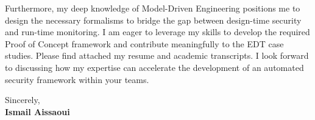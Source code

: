 \documentclass[11pt,a4paper]{article}
\begin{document}
\vspace{0.5em}
\noindent
Furthermore, my deep knowledge of Model-Driven Engineering positions me to design the necessary formalisms to bridge the gap between design-time security and run-time monitoring. I am eager to leverage my skills to develop the required Proof of Concept framework and contribute meaningfully to the EDT case studies. Please find attached my resume and academic transcripts. I look forward to discussing how my expertise can accelerate the development of an automated security framework within your teams.

\vspace{1.5em}
\noindent
Sincerely, \\[0.5em]
\textbf{Ismail Aissaoui}
\end{document}
